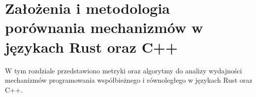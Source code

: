 





\chapter{Założenia i metodologia porównania mechanizmów w językach Rust oraz C++}
W tym rozdziale przedstawiono metryki oraz algorytmy do analizy wydajności mechanizmów programowania współbieżnego i równoległego w językach Rust oraz C++. 

